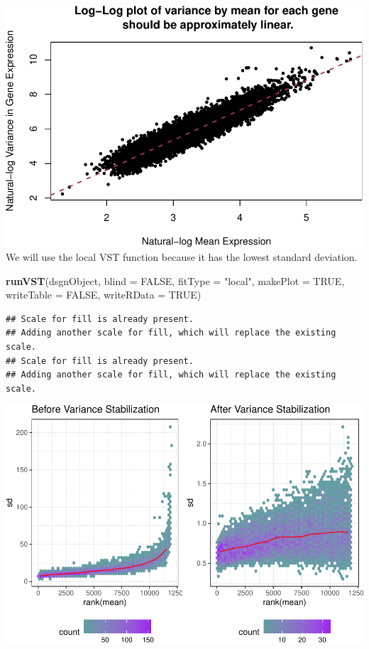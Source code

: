 \documentclass[
]{article}
\newenvironment{Shaded}{\begin{snugshade}}{\end{snugshade}}
\newcommand{\AttributeTok}[1]{\textcolor[rgb]{0.13,0.29,0.53}{#1}}
\newcommand{\ConstantTok}[1]{\textcolor[rgb]{0.56,0.35,0.01}{#1}}
\newcommand{\FunctionTok}[1]{\textcolor[rgb]{0.13,0.29,0.53}{\textbf{#1}}}
\newcommand{\NormalTok}[1]{#1}
\newcommand{\StringTok}[1]{\textcolor[rgb]{0.31,0.60,0.02}{#1}}
\begin{document}
\includegraphics{DPFE_files/figure-latex/unnamed-chunk-13-1.pdf} We will
use the local VST function because it has the lowest standard deviation.

\begin{Shaded}
\begin{Highlighting}[]
\FunctionTok{runVST}\NormalTok{(dsgnObject, }\AttributeTok{blind =} \ConstantTok{FALSE}\NormalTok{, }\AttributeTok{fitType =} \StringTok{"local"}\NormalTok{, }\AttributeTok{makePlot =} \ConstantTok{TRUE}\NormalTok{, }\AttributeTok{writeTable =} \ConstantTok{FALSE}\NormalTok{, }\AttributeTok{writeRData =} \ConstantTok{TRUE}\NormalTok{)}
\end{Highlighting}
\end{Shaded}

\begin{verbatim}
## Scale for fill is already present.
## Adding another scale for fill, which will replace the existing scale.
## Scale for fill is already present.
## Adding another scale for fill, which will replace the existing scale.
\end{verbatim}

\includegraphics{DPFE_files/figure-latex/unnamed-chunk-14-1.pdf}
\end{document}
